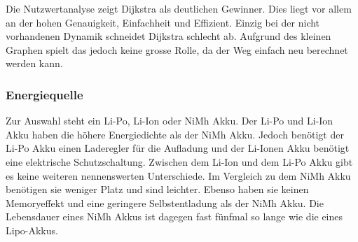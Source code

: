 \documentclass[../main.tex]{subfiles}
\begin{document}
Die Nutzwertanalyse zeigt Dijkstra als deutlichen Gewinner. Dies liegt vor allem an der hohen Genauigkeit, Einfachheit und Effizient. Einzig bei der nicht vorhandenen Dynamik schneidet Dijkstra schlecht ab. Aufgrund des kleinen Graphen spielt das jedoch keine grosse Rolle, da der Weg einfach neu berechnet werden kann.

\newpage

\subsubsection{Energiequelle}
\label{a3:Energiequelle}
Zur Auswahl steht ein Li-Po, Li-Ion oder NiMh Akku. Der Li-Po und Li-Ion Akku haben die höhere Energiedichte als der NiMh Akku. Jedoch benötigt der Li-Po Akku einen Laderegler für die Aufladung und der Li-Ionen Akku benötigt eine elektrische Schutzschaltung. Zwischen dem Li-Ion und dem Li-Po Akku gibt es keine weiteren nennenswerten Unterschiede. 
Im Vergleich zu dem NiMh Akku benötigen sie weniger Platz und sind leichter. Ebenso haben sie keinen Memoryeffekt und eine geringere Selbstentladung als der NiMh Akku. Die Lebensdauer eines NiMh Akkus ist dagegen fast fünfmal so lange wie die eines Lipo-Akkus.\footnotemark
{}
\end{document}

